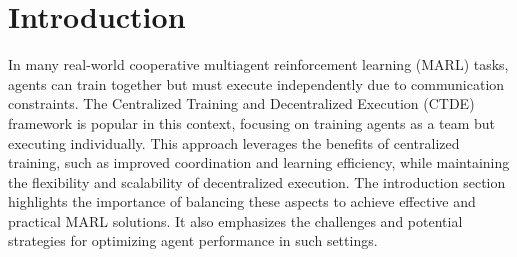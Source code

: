 \section{\textbf{Introduction}}
    In many real-world cooperative multiagent reinforcement learning (MARL) tasks, agents can train together but must execute independently due to communication constraints. The Centralized Training and Decentralized Execution (CTDE) framework is popular in this context, focusing on training agents as a team but executing individually. This approach leverages the benefits of centralized training, such as improved coordination and learning efficiency, while maintaining the flexibility and scalability of decentralized execution. The introduction section highlights the importance of balancing these aspects to achieve effective and practical MARL solutions. It also emphasizes the challenges and potential strategies for optimizing agent performance in such settings.
